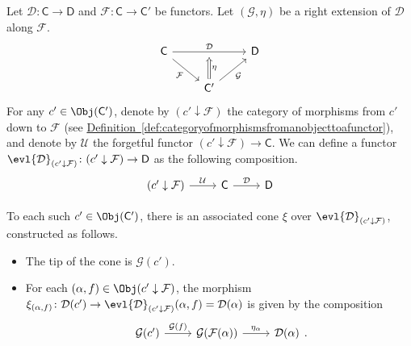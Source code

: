 \documentclass[main.tex]{subfiles}
\begin{document}
Let $\mathcal{D}\colon \mathsf{C} \to \mathsf{D}$ and $\mathcal{F}\colon \mathsf{C} \to \mathsf{C'}$ be functors. Let $(\mathcal{G}, \eta)$ be a right extension of $\mathcal{D}$ along $\mathcal{F}$.
\begin{equation*}
  \begin{tikzcd}
    \mathsf{C}
    \arrow[dr, swap, "\mathcal{F}"]
    \arrow[rr, "\mathcal{D}", ""'{name=U}]
    && \mathsf{D}
    \\
    & \mathsf{C'}
    \arrow[ur, swap, "\mathcal{G}"]
    \arrow[d, to=U, Rightarrow, swap, "\eta"]
  \end{tikzcd}
\end{equation*}
For any $c' \in \Obj(\mathsf{C}')$, denote by $(c' \downarrow \mathcal{F})$ the category of morphisms from $c'$ down to $\mathcal{F}$ (see \hyperref[def:categoryofmorphismsfromanobjecttoafunctor]{Definition~\ref*{def:categoryofmorphismsfromanobjecttoafunctor}}), and denote by $\mathcal{U}$ the forgetful functor $(c' \downarrow \mathcal{F}) \to \mathsf{C}$. We can define a functor $\evl{\mathcal{D}}_{(c' \downarrow \mathcal{F})}\colon (c' \downarrow \mathcal{F}) \to \mathsf{D}$ as the following composition.
\begin{equation*}
  \begin{tikzcd}
    (c' \downarrow \mathcal{F})
    \arrow[r, "\mathcal{U}"]
    & \mathsf{C}
    \arrow[r, "\mathcal{D}"]
    & \mathsf{D}
  \end{tikzcd}
\end{equation*}

To each such $c' \in \Obj(\mathsf{C}')$, there is an associated cone $\xi$ over $\evl{\mathcal{D}}_{(c' \downarrow \mathcal{F})}$, constructed as follows.

\begin{itemize}
  \item The tip of the cone is $\mathcal{G}(c')$.

  \item For each $(\alpha, f) \in \Obj(c' \downarrow \mathcal{F})$, the morphism $\xi_{(\alpha, f)}\colon\mathcal{D}(c') \to \evl{\mathcal{D}}_{(c' \downarrow \mathcal{F})}(\alpha, f) = \mathcal{D}(\alpha)$ is given by the composition
    \begin{equation*}
      \begin{tikzcd}
        \mathcal{G}(c')
        \arrow[r, "\mathcal{G}(f)"]
        & \mathcal{G}(\mathcal{F}(\alpha))
        \arrow[r, "\eta_{\alpha}"]
        & \mathcal{D}(\alpha)
      \end{tikzcd}.
    \end{equation*}
\end{itemize}
\end{document}
